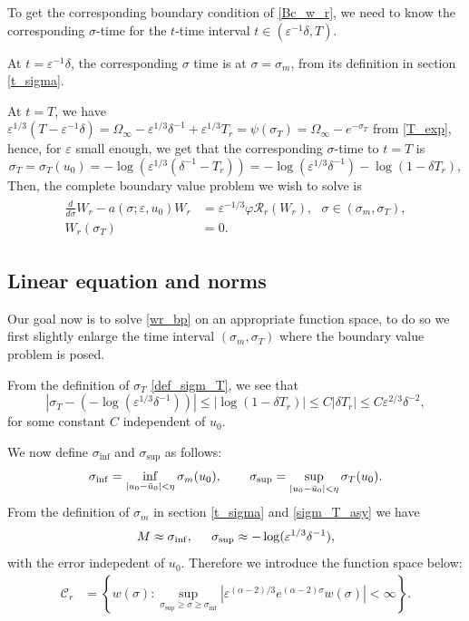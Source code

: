 \documentclass[letterpaper,11pt]{article}
\newcommand{\Ral}{\mathcal{R}}
\newcommand{\eps}{\varepsilon}
\numberwithin{equation}{section}
\theoremstyle{plain}
\begin{document}
To get the corresponding boundary condition of \ref{Bc_w_r}, we need to know the corresponding $\sigma$-time for the $t$-time interval $t\in (\eps^{-1}\delta, T)$.

At $t = \eps^{-1}\delta$, the corresponding $\sigma$ time is at $\sigma=\sigma_m$, from its definition in section \ref{t_sigma}.

At $t=T$, we have $\eps^{1/3}(T-\eps^{-1}\delta) = \Omega_\infty -\eps^{1/3}\delta^{-1}+\eps^{1/3}T_r=\psi(\sigma_T) = \Omega_\infty-e^{-\sigma_T}$ from \eqref{T_exp}, hence, for $\eps$ small enough, we get that the corresponding $\sigma$-time to $t=T$ is 
\begin{equation}\label{def_sigm_T}
\sigma_T=\sigma_T(u_0)= -\log(\eps^{1/3}(\delta^{-1}-T_r)) = -\log(\eps^{1/3}\delta^{-1}) - \log(1-\delta T_r),
\end{equation}
Then, the complete boundary value problem we wish to solve is
\begin{align}\label{wr_bp}
\begin{split}
\frac{d}{d\sigma} W_r - a(\sigma;\eps,u_0)W_r &= \eps^{-1/3}\varphi \Ral_r(W_r), \text{ } \sigma \in (\sigma_m, \sigma_T),\\
W_r(\sigma_T) &= 0.
\end{split}
\end{align}




\subsection{Linear equation and norms}




Our goal now is to solve \eqref{wr_bp} on an appropriate function space, to do so we first slightly enlarge the time interval $(\sigma_m, \sigma_T)$ where the boundary value problem is posed.

From the definition of $\sigma_T$ \eqref{def_sigm_T}, we see that
\begin{equation}\label{sigm_T_asy}
|\sigma_T -(-\log(\eps^{1/3}\delta^{-1}))| \le |\log(1-\delta T_r)| \le  C|\delta T_r|\le C\eps^{2/3}\delta^{-2},
\end{equation} 
for some constant $C$ independent of $u_0$.

We now define $\sigma_{\inf}$ and $\sigma_{\sup}$ as follows:
\[
\sigma_{\inf} = \inf_{|u_0-\bar{u}_0|<\eta}\sigma_m(u_0), \hspace{0.3in} \sigma_{\sup} = \sup_{|u_0-\bar{u}_0|<\eta}\sigma_T(u_0).
\]
From the definition of $\sigma_m$ in section \ref{t_sigma} and \eqref{sigm_T_asy} we have
\[
M \approx\sigma_{\inf} , \hspace{0.2in} \sigma_{\sup} \approx -\log(\eps^{1/3}\delta^{-1}),
\] with the error indepedent of $u_0$. 
Therefore we introduce the function space below:
\begin{align*}
\mathcal{C}_{r} &= \left\{ w(\sigma) : \sup_{\sigma_{\sup}\ge \sigma\ge \sigma_{\inf}} \left|\eps^{(\alpha-2)/3} e^{(\alpha-2)\sigma}w(\sigma)\right| < \infty \right\}. \\
\end{align*}
\end{document}
